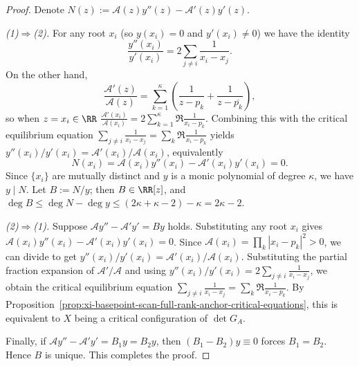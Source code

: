 \begin{proof}
Denote
\(
N(z):=\mathcal{A}(z)y''(z)-\mathcal{A}'(z)y'(z)
\).
\par
\emph{(1)\(\Rightarrow\)(2).}
For any root \(x_i\) (so \(y(x_i)=0\) and \(y'(x_i)\ne 0\)) we have the identity
\[
\frac{y''(x_i)}{y'(x_i)}=2\sum_{j\ne i}\frac{1}{x_i-x_j}.
\]
On the other hand,
\[
\frac{\mathcal{A}'(z)}{\mathcal{A}(z)}
=\sum_{k=1}^{\kappa}\left(\frac{1}{z-p_k}+\frac{1}{z-\overline{p_k}}\right),
\]
so when \(z=x_i\in\RR\)
\(
\frac{\mathcal{A}'(x_i)}{\mathcal{A}(x_i)}
=2\sum_{k=1}^{\kappa}\Re\frac{1}{x_i-p_k}
\).
Combining this with the critical equilibrium equation
\(
\sum_{j\ne i}\frac{1}{x_i-x_j}=\sum_{k}\Re\frac{1}{x_i-p_k}
\)
yields
\(
y''(x_i)/y'(x_i)=\mathcal{A}'(x_i)/\mathcal{A}(x_i)
\), equivalently
\[
N(x_i)=\mathcal{A}(x_i)y''(x_i)-\mathcal{A}'(x_i)y'(x_i)=0.
\]
Since \(\{x_i\}\) are mutually distinct and \(y\) is a monic polynomial of degree \(\kappa\), we have \(y\mid N\).
Let \(B:=N/y\); then \(B\in\RR[z]\), and
\(
\deg B\le \deg N-\deg y\le (2\kappa+\kappa-2)-\kappa=2\kappa-2
\).
\par
\emph{(2)\(\Rightarrow\)(1).}
Suppose \(\mathcal{A}y''-\mathcal{A}'y'=By\) holds.
Substituting any root \(x_i\) gives
\(
\mathcal{A}(x_i)y''(x_i)-\mathcal{A}'(x_i)y'(x_i)=0
\).
Since
\(
\mathcal{A}(x_i)=\prod_{k}|x_i-p_k|^2>0
\),
we can divide to get
\(
y''(x_i)/y'(x_i)=\mathcal{A}'(x_i)/\mathcal{A}(x_i)
\).
Substituting the partial fraction expansion of \(\mathcal{A}'/\mathcal{A}\) and using
\(
y''(x_i)/y'(x_i)=2\sum_{j\ne i}\frac{1}{x_i-x_j}
\),
we obtain the critical equilibrium equation
\(
\sum_{j\ne i}\frac{1}{x_i-x_j}=\sum_k\Re\frac{1}{x_i-p_k}
\).
By Proposition~\ref{prop:xi-basepoint-scan-full-rank-anchor-critical-equations}, this is equivalent to \(X\) being a critical configuration of \(\det G_A\).
\par
Finally, if \(\mathcal{A}y''-\mathcal{A}'y'=B_1y=B_2y\), then \((B_1-B_2)y\equiv 0\) forces \(B_1=B_2\).
Hence \(B\) is unique. This completes the proof.
\end{proof}

